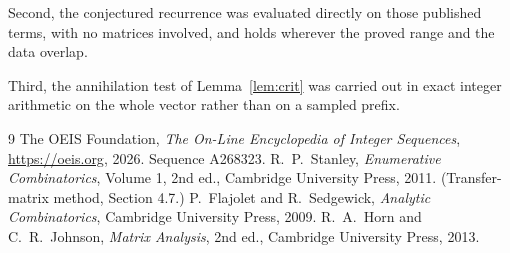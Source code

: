 \documentclass[11pt,a4paper]{article}
\theoremstyle{plain}
\theoremstyle{definition}
\begin{document}
Second, the conjectured recurrence was evaluated directly on those published terms, with no
matrices involved, and holds wherever the proved range and the data overlap.

Third, the annihilation test of Lemma~\ref{lem:crit} was carried out in exact integer
arithmetic on the whole vector rather than on a sampled prefix.

\begin{thebibliography}{9}
 The OEIS Foundation, \emph{The On-Line Encyclopedia of Integer
Sequences}, \url{https://oeis.org}, 2026. Sequence A268323.
 R.~P.~Stanley, \emph{Enumerative Combinatorics}, Volume 1, 2nd ed.,
Cambridge University Press, 2011. (Transfer-matrix method, Section 4.7.)
 P.~Flajolet and R.~Sedgewick, \emph{Analytic Combinatorics}, Cambridge
University Press, 2009.
 R.~A.~Horn and C.~R.~Johnson, \emph{Matrix Analysis}, 2nd ed., Cambridge
University Press, 2013.
\end{thebibliography}
\end{document}
